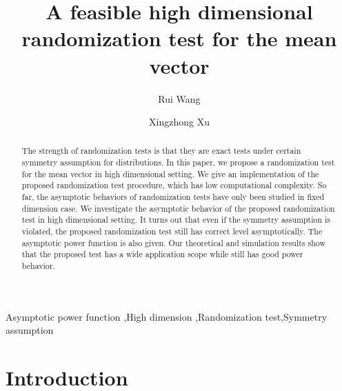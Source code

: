 \documentclass[3p]{elsarticle}
\theoremstyle{plain}
\theoremstyle{definition}
\theoremstyle{remark}
\begin{document}
\begin{frontmatter}
\title{A feasible high dimensional randomization test for the mean vector}

\author[mymainaddress]{Rui Wang}
\author[mymainaddress,mysecondaryaddress]{Xingzhong Xu}
\address[mymainaddress]{School of Mathematics and Statistics, Beijing Institute of Technology, Beijing 100081,China}
\address[mysecondaryaddress]{Beijing Key Laboratory on MCAACI, Beijing Institute of Technology, Beijing 100081,China}

\begin{abstract}
    The strength of randomization tests is that they are exact tests under certain symmetry assumption for distributions.
    In this paper, we propose a randomization test for the mean vector in high dimensional setting. 
    We give an implementation of the proposed randomization test procedure, which has low computational complexity.
    So far, the asymptotic behaviors of randomization tests have only been studied in fixed dimension case.
    We investigate the asymptotic behavior of the proposed randomization test in high dimensional setting.
    It turns out that even if the symmetry assumption is violated, the proposed randomization test still has correct level asymptotically.
    The asymptotic power function is also given.
Our theoretical and simulation results show that the proposed test has a wide application scope while still has good power behavior.
    

\end{abstract}

\begin{keyword}
   Asymptotic power function \sep High dimension \sep Randomization test\sep Symmetry assumption
\end{keyword}
\end{frontmatter}

\section{Introduction}
\end{document}
